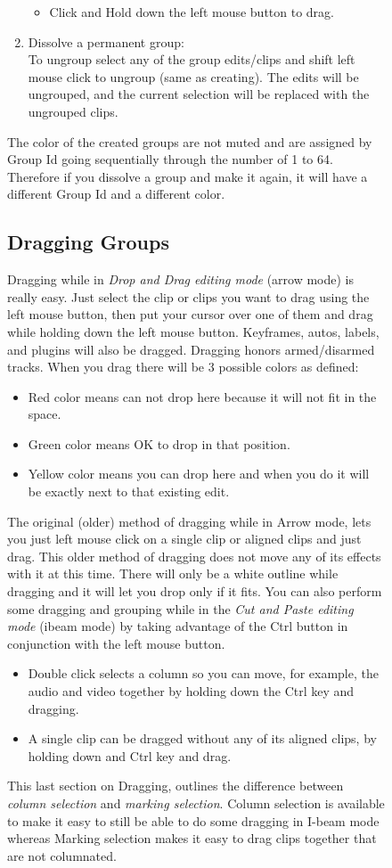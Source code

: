 \begin{figure}
\begin{enumerate}
\begin{itemize}[noitemsep]
        \item Click and Hold down the left mouse button to drag.
    \end{itemize}
    \item Dissolve a permanent group:\\
    To ungroup select any of the group edits/clips and shift left mouse click to ungroup (same as creating).
    The edits will be ungrouped, and the current selection will be replaced with the ungrouped clips.
\end{enumerate}
The color of the created groups are not muted and are assigned by Group Id going sequentially through the number of 1 to 64.  Therefore if you dissolve a group and make it again, it will have a different Group Id and a different color.

\subsection{Dragging Groups}%
\label{sub:dragging_groups}

Dragging while in \textit{Drop and Drag editing mode} (arrow mode) is really easy.  Just select the clip or clips you want to drag using the left mouse button, then put your cursor over one of them and drag while holding down the left mouse button.  Keyframes, autos, labels, and plugins will also be dragged.   Dragging honors armed/disarmed tracks.  When you drag there will be 3 possible colors as defined:
\begin{itemize}
    \item Red color means can not drop here because it will not fit in the space.
    \item Green color means OK to drop in that position.
    \item Yellow color means you can drop here and when you do it will be exactly next to that existing edit.
\end{itemize}
The original (older) method of dragging while in Arrow mode, lets you just left mouse click on a single clip or aligned clips and just drag.  This older method of dragging does not move any of its effects with it at this time.  There will only be a white outline while dragging and it will let you drop only if it fits.  You can also perform some dragging and grouping while in the \textit{Cut and Paste editing mode} (ibeam mode) by taking advantage of the Ctrl button in conjunction with the left mouse button.
\begin{itemize}
    \item Double click selects a column so you can move, for example, the audio and video together by holding
    down the Ctrl key and dragging.
    \item A single clip can be dragged without any of its aligned clips, by holding down and Ctrl key and drag.
\end{itemize}
This last section on Dragging, outlines the difference between \textit{column selection} and \textit{marking selection}.  Column selection is available to make it easy to still be able to do some dragging in I-beam mode whereas Marking selection makes it easy to drag clips together that are not columnated.


\end{figure}
